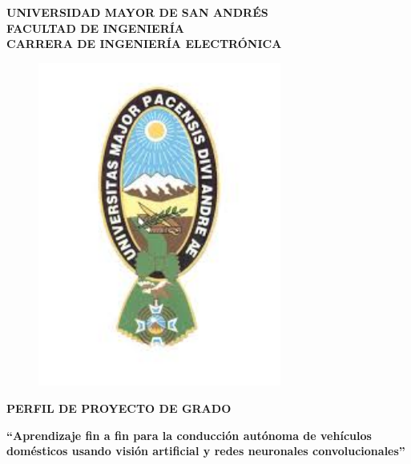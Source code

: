 \documentclass[12pt,letterpaper]{article}
\begin{document}
\marginsize{2.5cm}{2cm}{2cm}{2cm} 



\begin{titlepage}
\begin{center}
\vspace*{-0.5in}
\begin{large}
\textbf{UNIVERSIDAD MAYOR DE SAN ANDRÉS}\\
\vspace*{0.15in}
\textbf{FACULTAD DE INGENIERÍA}\\
\vspace*{0.15in}
\textbf{CARRERA DE INGENIERÍA ELECTRÓNICA}\\
\vspace*{0.1in}
\end{large}
\begin{figure}[htb]
\begin{center}
\includegraphics[width=8cm]{umsa.jpg}
\end{center}
\end{figure}
\begin{Large}
\textbf{PERFIL DE PROYECTO DE GRADO} 
\end{Large}
\vspace*{0.4in}

\begin{normalsize}
\textbf{``Aprendizaje fin a fin para la conducción autónoma de vehículos domésticos usando visión artificial y redes neuronales convolucionales''} \\
\end{normalsize}


\end{center}
\end{titlepage}
\end{document}
